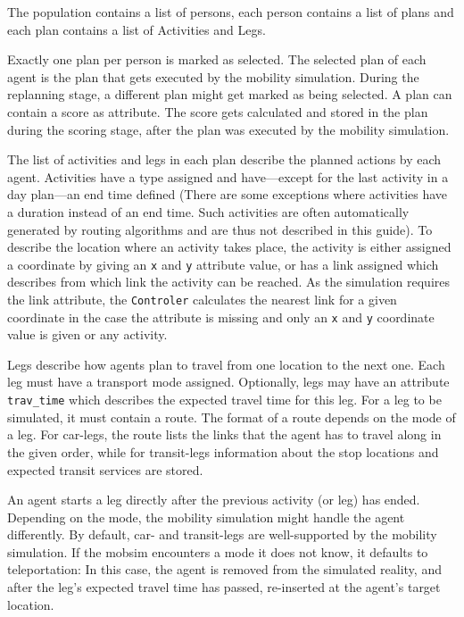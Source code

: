 The population contains a list of persons, each person contains a list of plans and each plan contains a list of Activities and Legs.

Exactly one plan per person is marked as selected. The selected plan of each agent is the plan that gets executed by the mobility simulation. During the replanning stage, a different plan might get marked as being selected. A plan can contain a score as attribute. The score gets calculated and stored in the plan during the scoring stage, after the plan was executed by the mobility simulation.

The list of activities and legs in each plan describe the planned actions by each agent. Activities have a type assigned and have---except for the last activity in a day plan---an end time defined (There are some exceptions where activities have a duration instead of an end time. Such activities are often automatically generated by routing algorithms and are thus not described in this guide). To describe the location where an activity takes place, the activity is either assigned a coordinate by giving an \lstinline|x| and \lstinline|y| attribute value, or has a link assigned which describes from which link the activity can be reached. As the simulation requires the link attribute, the \lstinline|Controler| calculates the nearest link for a given coordinate in the case the attribute is missing and only an \lstinline|x| and \lstinline|y| coordinate value is given or any activity.

Legs describe how agents plan to travel from one location to the next one. Each leg must have a transport mode assigned. Optionally, legs may have an attribute \lstinline|trav_time| which describes the expected travel time for this leg. For a leg to be simulated, it must contain a route. The format of a route depends on the mode of a leg. For car-legs, the route lists the links that the agent has to travel along in the given order, while for transit-legs information about the stop locations and expected transit services are stored.

An agent starts a leg directly after the previous activity (or leg) has ended. Depending on the mode, the mobility simulation might handle the agent differently. By default, car- and transit-legs are well-supported by the mobility simulation. If the mobsim encounters a mode it does not know, it defaults to teleportation: In this case, the agent is removed from the simulated reality, and after the leg's expected travel time has passed, re-inserted at the agent's target location.

